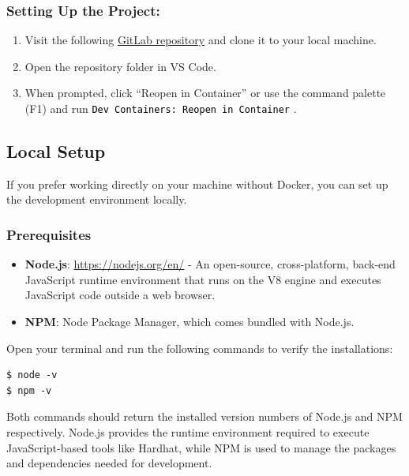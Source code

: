 \documentclass[12pt]{article}
\newcommand{\codegrey}[1]{%
  \texttt{\colorbox{black!4}{\textcolor{black}{#1}}}%
}
\begin{document}
\subsubsection*{Setting Up the Project:}

\begin{enumerate}
    \item Visit the following
          \href{https://gitlab.fel.cvut.cz/radovluk/smart-contracts-exercises/-/tree/main/07-Out-of-Gas/task/task-code}{GitLab
              repository} and clone it to your local machine.
    \item Open the repository folder in VS Code.
    \item When prompted, click ``Reopen in Container'' or use the command palette (F1)
          and run \codegrey{Dev Containers: Reopen in Container}.
\end{enumerate}

\subsection{Local Setup}

If you prefer working directly on your machine without Docker, you can set up
the development environment locally.

\subsubsection*{Prerequisites}
\begin{itemize}
    \item \textbf{Node.js}: \url{https://nodejs.org/en/} - An open-source, cross-platform, back-end JavaScript runtime environment that runs on the V8 engine and executes JavaScript code outside a web browser.
    \item \textbf{NPM}: Node Package Manager, which comes bundled with Node.js.
\end{itemize}

\noindent
Open your terminal and run the following commands to verify the installations:

\begin{verbatim}
$ node -v
$ npm -v
\end{verbatim}

Both commands should return the installed version numbers of Node.js and NPM
respectively. Node.js provides the runtime environment required to execute
JavaScript-based tools like Hardhat, while NPM is used to manage the packages
and dependencies needed for development.
\end{document}

